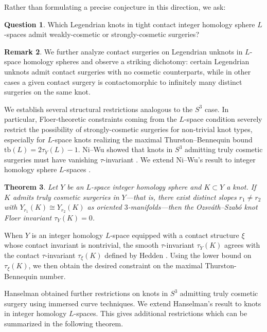 \documentclass[12pt]{amsart}
\newtheorem{theorem}{Theorem}[section]
\theoremstyle{definition}
\newtheorem{remark} [theorem] {Remark}
\newtheorem{question} [theorem] {Question}
\theoremstyle{definition}
\newcommand{\tb}{\text{tb}}
\begin{document}
Rather than formulating a precise conjecture in this direction, we ask:

\begin{question}
Which Legendrian knots in tight contact integer homology sphere $L$-spaces  admit weakly-cosmetic or strongly-cosmetic surgeries?
\end{question}
\begin{remark}
    We further analyze contact surgeries on Legendrian unknots in $L$-space homology spheres and observe a striking dichotomy: certain Legendrian unknots admit contact surgeries with no cosmetic counterparts, while in other cases a given contact surgery is contactomorphic to infinitely many distinct surgeries on the same knot.
\end{remark}
We establish several structural restrictions analogous to the $S^3$ case. In particular, Floer-theoretic constraints coming from the $L$-space condition severely restrict the possibility of strongly-cosmetic surgeries for non-trivial knot types, especially for $L$-space knots realizing the maximal Thurston–Bennequin bound $\tb(L)=2\tau_Y(L)-1$. Ni–Wu showed that knots in $S^3$ admitting truly cosmetic surgeries must have vanishing $\tau$-invariant \cite{NiWu}. We extend Ni–Wu’s result to integer homology sphere $L$-spaces .

\begin{theorem}
\label{tauresult}
Let $Y$ be an  $L$-space  integer homology sphere and $K\subset Y$ a knot.
If $K$ admits truly cosmetic surgeries in $Y$—that is, there exist distinct slopes
$r_1\neq r_2$ with $Y_{r_1}(K)\cong Y_{r_2}(K)$ as oriented $3$-manifolds—then the
Ozsváth–Szabó knot Floer invariant $\tau_Y(K)=0$. 
\end{theorem}

When $Y$ is an integer homology $L$-space equipped with a contact structure $\xi$  whose contact invariant is nontrivial, the smooth $\tau$-invariant $\tau_Y(K)$ agrees with the contact $\tau$-invariant $\tau_\xi(K)$ defined by Hedden \cite{HEDDENcontacttau}. Using the lower bound on $\tau_\xi(K)$, we then obtain the desired constraint on the maximal Thurston-Bennequin number.

Hanselman \cite{Han} obtained further restrictions on knots in $S^3$ admitting truly cosmetic surgery using immersed curve techniques. We extend Hanselman's result to knots in integer homology $L$-spaces. This  gives additional restrictions which can be summarized in the following theorem.
\end{document}
